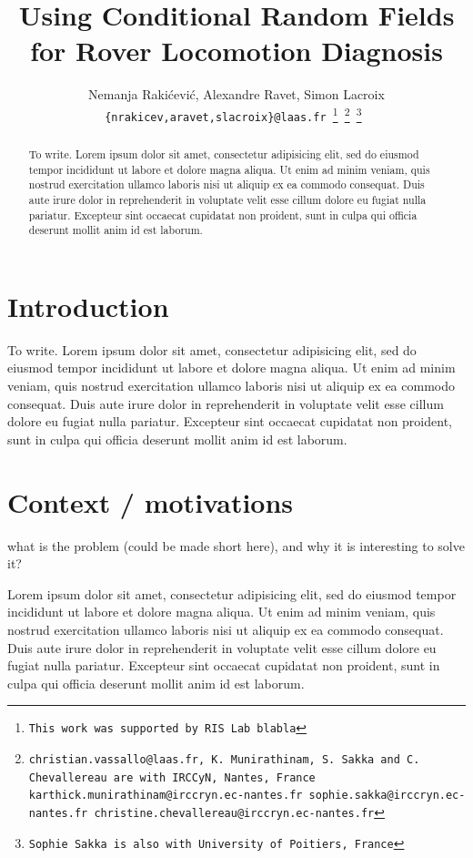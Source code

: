 \documentclass[a4paper, 10pt, conference]{ieeeconf}
\title{\LARGE \bf Using Conditional Random Fields for Rover Locomotion Diagnosis}
\author{Nemanja Raki\'{c}evi\'{c}, Alexandre Ravet, Simon Lacroix \\
\tt\small \{nrakicev,aravet,slacroix\}@laas.fr
\thanks{This work was supported by RIS Lab blabla}%
\thanks{christian.vassallo@laas.fr, K. Munirathinam, S. Sakka and C. Chevallereau are with IRCCyN, Nantes, France
        {\tt\small karthick.munirathinam@irccryn.ec-nantes.fr sophie.sakka@irccryn.ec-nantes.fr christine.chevallereau@irccryn.ec-nantes.fr}}%
\thanks{Sophie Sakka is also with University of Poitiers, France}%
}
\begin{document}
\maketitle
\thispagestyle{empty}
\pagestyle{empty}


\begin{abstract}
To write.
Lorem ipsum dolor sit amet, consectetur adipisicing elit, sed do eiusmod tempor incididunt ut labore et dolore magna aliqua. Ut enim ad minim veniam, quis nostrud exercitation ullamco laboris nisi ut aliquip ex ea commodo consequat. Duis aute irure dolor in reprehenderit in voluptate velit esse cillum dolore eu fugiat nulla pariatur. Excepteur sint occaecat cupidatat non proident, sunt in culpa qui officia deserunt mollit anim id est laborum.\par
\end{abstract}


\section{Introduction}
To write.
Lorem ipsum dolor sit amet, consectetur adipisicing elit, sed do eiusmod tempor incididunt ut labore et dolore magna aliqua. Ut enim ad minim veniam, quis nostrud exercitation ullamco laboris nisi ut aliquip ex ea commodo consequat. Duis aute irure dolor in reprehenderit in voluptate velit esse cillum dolore eu fugiat nulla pariatur. Excepteur sint occaecat cupidatat non proident, sunt in culpa qui officia deserunt mollit anim id est laborum. \par



\section{Context / motivations}

what is the problem (could be made short here), and why it is interesting to solve it?

Lorem ipsum dolor sit amet, consectetur adipisicing elit, sed do eiusmod tempor incididunt ut labore et dolore magna aliqua. Ut enim ad minim veniam, quis nostrud exercitation ullamco laboris nisi ut aliquip ex ea commodo consequat. Duis aute irure dolor in reprehenderit in voluptate velit esse cillum dolore eu fugiat nulla pariatur. Excepteur sint occaecat cupidatat non proident, sunt in culpa qui officia deserunt mollit anim id est laborum. 
\end{document}

